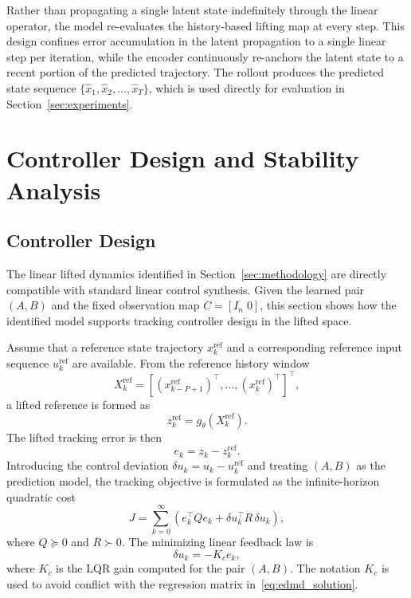 \documentclass[journal]{IEEEtran}
\begin{document}
Rather than propagating a single latent state indefinitely through the linear operator, the model re-evaluates the history-based lifting map at every step. This design confines error accumulation in the latent propagation to a single linear step per iteration, while the encoder continuously re-anchors the latent state to a recent portion of the predicted trajectory. The rollout produces the predicted state sequence $\{\hat{x}_1,\hat{x}_2,\ldots,\hat{x}_T\}$, which is used directly for evaluation in Section~\ref{sec:experiments}.

\section{Controller Design and Stability Analysis}
\label{sec:control}

\subsection{Controller Design}
\label{subsec:controller_design}

The linear lifted dynamics identified in Section~\ref{sec:methodology} are directly compatible with standard linear control synthesis. Given the learned pair $(A, B)$ and the fixed observation map $C = [I_n\;0]$, this section shows how the identified model supports tracking controller design in the lifted space.

Assume that a reference state trajectory $x_k^{\mathrm{ref}}$ and a corresponding reference input sequence $u_k^{\mathrm{ref}}$ are available. From the reference history window
\begin{equation}
    X_k^{\mathrm{ref}} = [(x_{k-P+1}^{\mathrm{ref}})^\top,\ldots,(x_k^{\mathrm{ref}})^\top]^\top,
\end{equation}
a lifted reference is formed as
\begin{equation}
    z_k^{\mathrm{ref}} = g_\theta(X_k^{\mathrm{ref}}).
    \label{eq:reference_lifting}
\end{equation}
The lifted tracking error is then
\begin{equation}
    e_k = z_k - z_k^{\mathrm{ref}}.
    \label{eq:tracking_error}
\end{equation}
Introducing the control deviation $\delta u_k = u_k - u_k^{\mathrm{ref}}$ and treating $(A,B)$ as the prediction model, the tracking objective is formulated as the infinite-horizon quadratic cost
\begin{equation}
    J = \sum_{k=0}^{\infty}
    \left(e_k^\top Q e_k + \delta u_k^\top R\,\delta u_k\right),
    \label{eq:lqr_objective}
\end{equation}
where $Q\succeq 0$ and $R\succ 0$. The minimizing linear feedback law is
\begin{equation}
    \delta u_k = -K_c e_k,
    \label{eq:lqr_control}
\end{equation}
where $K_c$ is the LQR gain computed for the pair $(A,B)$. The notation $K_c$ is used to avoid conflict with the regression matrix in~\eqref{eq:edmd_solution}.
\end{document}
